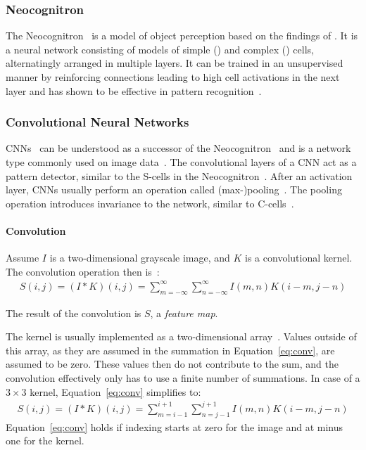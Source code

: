 \subsubsection{Neocognitron}

The Neocognitron~\citep{fukushima1980neocognitron} is a model of object perception based on the findings of \citet{hubel1962receptive}.
It is a neural network consisting of models of simple () and complex () cells, alternatingly arranged in multiple layers.
It can be trained in an unsupervised manner by reinforcing connections leading to high cell activations in the next layer and has shown to be effective in pattern recognition~\citep{fukushima1980neocognitron}.

\subsubsection{Convolutional Neural Networks}\label{subsubsec:cnn_model_visual_system}
\acp{CNN}~\citep{lecun1989backpropagation} can be understood as a successor of the Neocognitron~\citep{lindsay2020convolutional} and is a network type commonly used on image data~\citep[p. 326]{Goodfellow-et-al-2016}.
The convolutional layers of a \ac{CNN} act as a pattern detector, similar to the S-cells in the Neocognitron~\citep{lindsay2020convolutional}.
After an activation layer, \acp{CNN} usually perform an operation called (max-)pooling~\citep[pp. 326, 339]{Goodfellow-et-al-2016}.
The pooling operation introduces invariance to the network, similar to C-cells~\citep{lindsay2020convolutional}.

\paragraph{Convolution}

Assume $I$ is a two-dimensional grayscale image, and $K$ is a convolutional kernel.
The convolution operation then is~\citep[p. 327]{Goodfellow-et-al-2016}:
\begin{align}
    S(i, j)=(I * K)(i, j)=\sum_{m=-\infty}^{\infty} \sum_{n=-\infty}^{\infty} I(m, n) K(i-m, j-n) \label{eq:conv}
\end{align}

The result of the convolution is $S$, a \textit{feature map}.

The kernel is usually implemented as a two-dimensional array~\citep[p. 327]{Goodfellow-et-al-2016}.
Values outside of this array, as they are assumed in the summation in Equation~\ref{eq:conv}, are assumed to be zero.
These values then do not contribute to the sum, and the convolution effectively only has to use a finite number of summations.
In case of a $3\times 3$ kernel, Equation~\ref{eq:conv} simplifies to:
\begin{align}
    S(i, j)=(I * K)(i, j)=\sum_{m=i-1}^{i+1} \sum_{n=j-1}^{j+1} I(m, n) K(i-m, j-n) \label{eq:conv_boiled_down}
\end{align}
Equation~\ref{eq:conv} holds if indexing starts at zero for the image and at minus one for the kernel.

